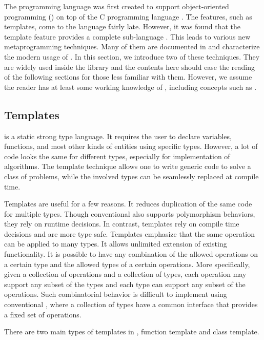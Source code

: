The \cpp programming language \cite{cpp03} was first created to support
object-oriented programming (\oop) on top of the C programming language
\cite{evolutioncpp}.  The features, such as templates, come to the language
fairly late. However, it was found that the \cpp template feature provides a
complete sub-language \cite{cpptemplateturing}. This leads to various new
metaprogramming techniques. Many of them are documented in \cite{moderncpp}
and characterize the modern usage of \cpp. In this section, we introduce two
of these techniques. They are widely used inside the \vsmc library and the
contents here should ease the reading of the following sections for those less
familiar with them. However, we assume the reader has at least some working
knowledge of \cpp, including concepts such as \oop.

\subsection{Templates}
\label{sub:Templates}

\cpp is a static strong type language. It requires the user to declare
variables, functions, and most other kinds of entities using specific types.
However, a lot of code looks the same for different types, especially for
implementation of algorithms. The \cpp template technique allows one to write
generic code to solve a class of problems, while the involved types can be
seamlessly replaced at compile time.

Templates are useful for a few reasons. It reduces duplication of the same
code for multiple types. Though conventional \oop also supports polymorphism
behaviors, they rely on runtime decisions. In contrast, templates rely on
compile time decisions and are more type safe. Templates emphasize that the
same operation can be applied to many types. It allows unlimited extension of
existing functionality. It is possible to have any combination of the allowed
operations on a certain type and the allowed types of a certain operations.
More specifically, given a collection of operations and a collection of types,
each operation may support any subset of the types and each type can support
any subset of the operations. Such combinatorial behavior is difficult to
implement using conventional \oop, where a collection of types have a common
interface that provides a fixed set of operations.

There are two main types of templates in \cpp, function template and class
template.

